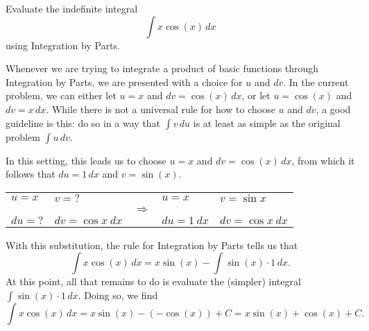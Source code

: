 \begin{example} \label{eg:5.1.1} %
Evaluate the indefinite integral
$$\int x\cos(x) \, dx$$
using Integration by Parts.

\solution Whenever we are trying to integrate a product of basic functions through Integration by Parts, we are presented with a choice for $u$ and $dv$.  In the current problem, we can either let $u = x$ and $dv = \cos(x) \, dx$, or let $u = \cos(x)$ and $dv = x \, dx$.  While there is not a universal rule for how to choose $u$ and $dv$, a good guideline is this:  do so in a way that $\int v \, du$ is at least as simple as the original problem $\int u \, dv$.  

In this setting, this leads us to choose $u = x$ and $dv = \cos(x) \, dx$, from which it follows that $du = 1 \, dx$ and $v = \sin(x)$. 

\begin{tabular}{llcll} \\
$u= x$ & $v=\text{?}$ & & $u= x$ & $v=\sin x$ \\
 && $\Rightarrow$ && \\
$du= \text{?}$ & $dv=\cos x\ dx$ & &  $du= 1\ dx$ & $dv=\cos x\ dx$ \\
\end{tabular}

\vspace{.25cm}

With this substitution, the rule for Integration by Parts tells us that
$$\int x \cos(x) \, dx = x \sin(x) - \int \sin(x) \cdot 1 \, dx.$$
At this point, all that remains to do is evaluate the (simpler) integral $\int \sin(x) \cdot 1 \, dx.$  Doing so, we find
$$\int x \cos(x) \, dx = x \sin(x) - (-\cos(x)) + C = x\sin(x) + \cos(x) + C.$$

\end{example}

